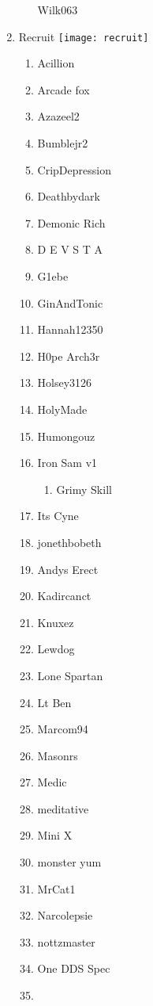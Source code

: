 \documentclass{article}
\begin{document}
\begin{enumerate}[I]
\begin{enumerate}[I]
	Wilk063
    \end{enumerate}
  \item
    Recruit \texttt{[image: recruit]}
    \begin{enumerate}[I]
      \item 
	Acillion
      \item
	Arcade fox
      \item
	Azazeel2
      \item
	Bumblejr2
      \item
	CripDepression
      \item
	Deathbydark
      \item
	Demonic Rich
      \item
	D E V S T A
      \item
	G1ebe
      \item
	GinAndTonic
      \item
	Hannah12350
      \item
	H0pe Arch3r
      \item
	Holsey3126
      \item
	HolyMade
      \item
	Humongouz
      \item
	Iron Sam v1
	  \begin{enumerate}[I]
	    \item
	      Grimy Skill
	  \end{enumerate}
      \item
	Its Cyne
      \item
	jonethbobeth
      \item
	Andys Erect
      \item
	Kadircanct
      \item
	Knuxez
      \item
	Lewdog
      \item
	Lone Spartan
      \item
	Lt Ben
      \item
	Marcom94
      \item
	Masonrs
      \item
	Medic
      \item
	meditative
      \item
	Mini X
      \item
	monster yum
      \item
	MrCat1
      \item
	Narcolepsie
      \item
	nottzmaster
      \item
	One DDS Spec
      \item

\end{enumerate}
\end{enumerate}
\end{document}
